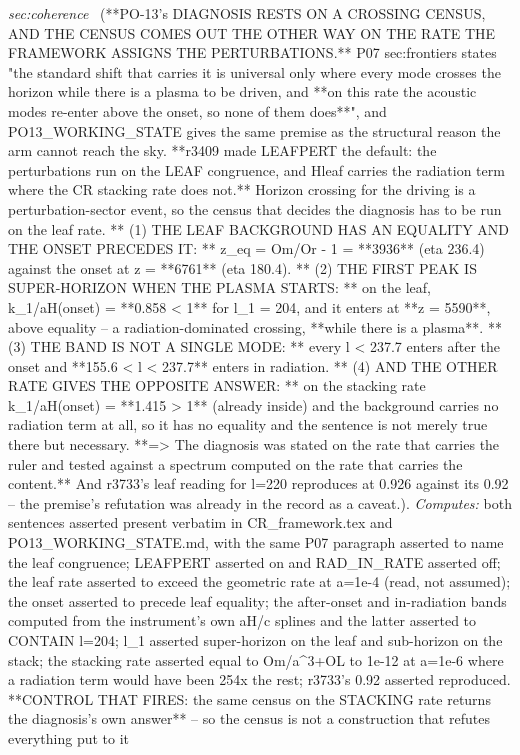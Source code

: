 \begin{description}
\textit{sec:coherence} \ (**PO-13's DIAGNOSIS RESTS ON A CROSSING CENSUS, AND THE CENSUS COMES OUT THE OTHER WAY ON THE RATE THE FRAMEWORK ASSIGNS THE PERTURBATIONS.** P07 sec:frontiers states "the standard shift that carries it is universal only where every mode crosses the horizon while there is a plasma to be driven, and **on this rate the acoustic modes re-enter above the onset, so none of them does**", and PO13\_WORKING\_STATE gives the same premise as the structural reason the arm cannot reach the sky. **r3409 made LEAFPERT the default: the perturbations run on the LEAF congruence, and Hleaf carries the radiation term where the CR stacking rate does not.** Horizon crossing for the driving is a perturbation-sector event, so the census that decides the diagnosis has to be run on the leaf rate. ** (1) THE LEAF BACKGROUND HAS AN EQUALITY AND THE ONSET PRECEDES IT: ** z\_eq = Om/Or - 1 = **3936** (eta 236.4) against the onset at z = **6761** (eta 180.4). ** (2) THE FIRST PEAK IS SUPER-HORIZON WHEN THE PLASMA STARTS: ** on the leaf, k\_1/aH(onset) = **0.858 < 1** for l\_1 = 204, and it enters at **z = 5590**, above equality -- a radiation-dominated crossing, **while there is a plasma**. ** (3) THE BAND IS NOT A SINGLE MODE: ** every l < 237.7 enters after the onset and **155.6 < l < 237.7** enters in radiation. ** (4) AND THE OTHER RATE GIVES THE OPPOSITE ANSWER: ** on the stacking rate k\_1/aH(onset) = **1.415 > 1** (already inside) and the background carries no radiation term at all, so it has no equality and the sentence is not merely true there but necessary. **=> The diagnosis was stated on the rate that carries the ruler and tested against a spectrum computed on the rate that carries the content.**  And r3733's leaf reading for l=220 reproduces at 0.926 against its 0.92 -- the premise's refutation was already in the record as a caveat.). 
\emph{Computes:} both sentences asserted present verbatim in CR\_framework.tex and PO13\_WORKING\_STATE.md, with the same P07 paragraph asserted to name the leaf congruence; LEAFPERT asserted on and RAD\_IN\_RATE asserted off; the leaf rate asserted to exceed the geometric rate at a=1e-4 (read, not assumed); the onset asserted to precede leaf equality; the after-onset and in-radiation bands computed from the instrument's own aH/c splines and the latter asserted to CONTAIN l=204; l\_1 asserted super-horizon on the leaf and sub-horizon on the stack; the stacking rate asserted equal to Om/a\textasciicircum{}3+OL to 1e-12 at a=1e-6 where a radiation term would have been 254x the rest; r3733's 0.92 asserted reproduced. **CONTROL THAT FIRES: the same census on the STACKING rate returns the diagnosis's own answer** -- so the census is not a construction that refutes everything put to it

\end{description}
